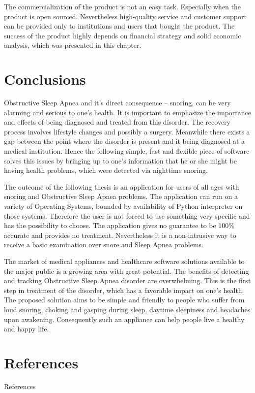 \documentclass[12pt,a4paper]{report}
\begin{document}
The commercialization of the product is not an easy task. Especially when the product is open sourced. Nevertheless high-quality service and customer support can be provided only to institutions and users that bought the product. The success of the product highly depends on financial strategy and solid economic analysis, which was presented in this chapter.

\chapter*{Conclusions}
Obstructive Sleep Apnea and it's direct consequence -- snoring, can be very alarming and serious to one's health. It is important to emphasize the importance and effects of being diagnosed and treated from this disorder. The recovery process involves lifestyle changes and possibly a surgery. Meanwhile there exists a gap between the point where the disorder is present and it being diagnosed at a medical institution. Hence the following simple, fast and flexible piece of software solves this issues by bringing up to one's information that he or she might be having health problems, which were detected via nighttime snoring.

The outcome of the following thesis is an application for users of all ages with snoring and Obstructive Sleep Apnea problems. The application can run on a variety of Operating Systems, bounded by availability of Python interpreter on those systems. Therefore the user is not forced to use something very specific and has the possibility to choose. The application gives no guarantee to be 100\% accurate and provides no treatment. Nevertheless it is a non-intrusive way to receive a basic examination over snore and Sleep Apnea problems. 

The market of medical appliances and healthcare software solutions available to the major public is a growing area with great potential. The benefits of detecting and tracking Obstructive Sleep Apnea disorder are overwhelming. This is the first step in treatment of the disorder, which has a favorable impact on one's health. The proposed solution aims to be simple and friendly to people who suffer from loud snoring, choking and gasping during sleep, daytime sleepiness and headaches upon awakening. Consequently such an appliance can help people live a healthy and happy life.

\chapter*{References}
References
\end{document}
